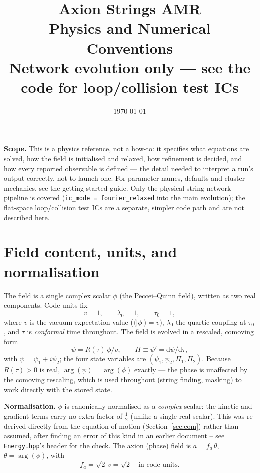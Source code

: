 \documentclass[11pt]{article}
\title{\vspace{-1.5cm}\textbf{\Huge Axion Strings AMR}\\[0.3cm]\Large Physics and Numerical Conventions\\[0.15cm]\normalsize Network evolution only --- see the code for loop/collision test ICs}
\author{}
\date{\today}
\newcommand{\psivec}{\psi}
\begin{document}
\maketitle
\vspace{-1.0cm}

\begin{note}
\textbf{Scope.} This is a physics reference, not a how-to: it specifies what equations are solved, how the
field is initialised and relaxed, how refinement is decided, and how every reported observable is defined
--- the detail needed to interpret a run's output correctly, not to launch one. For parameter names,
defaults and cluster mechanics, see the getting-started guide. Only the physical-string network pipeline is
covered (\texttt{ic\_mode = fourier\_relaxed} into the main evolution); the flat-space loop/collision test
ICs are a separate, simpler code path and are not described here.
\end{note}

\tableofcontents

\section{Field content, units, and normalisation}
\label{sec:units}

The field is a single complex scalar $\phi$ (the Peccei--Quinn field), written as two real components. Code
units fix
\[
v = 1, \qquad \lambda_0 = 1, \qquad \tau_0 = 1,
\]
where $v$ is the vacuum expectation value ($\langle|\phi|\rangle = v$), $\lambda_0$ the quartic coupling at
$\tau_0$, and $\tau$ is \emph{conformal} time throughout. The field is evolved in a rescaled, comoving form
\[
\psivec = R(\tau)\,\phi/v, \qquad \Pi \equiv \psivec' = \mathrm{d}\psivec/\mathrm{d}\tau,
\]
with $\psivec = \psivec_1 + i\psivec_2$; the four state variables are $(\psivec_1,\psivec_2,\Pi_1,\Pi_2)$.
Because $R(\tau)>0$ is real, $\arg(\psivec) = \arg(\phi)$ exactly --- the phase is unaffected by the
comoving rescaling, which is used throughout (string finding, masking) to work directly with the stored
state.

\textbf{Normalisation.} $\phi$ is canonically normalised as a \emph{complex} scalar: the kinetic and
gradient terms carry no extra factor of $\tfrac12$ (unlike a single real scalar). This was re-derived
directly from the equation of motion (Section~\ref{sec:eom}) rather than assumed, after finding an error of
this kind in an earlier document -- see \texttt{Energy.hpp}'s header for the check. The axion (phase) field
is $a = f_a\,\theta$, $\theta=\arg(\phi)$, with
\[
f_a = \sqrt{2}\,v = \sqrt{2} \quad \text{in code units.}
\]
\end{document}
